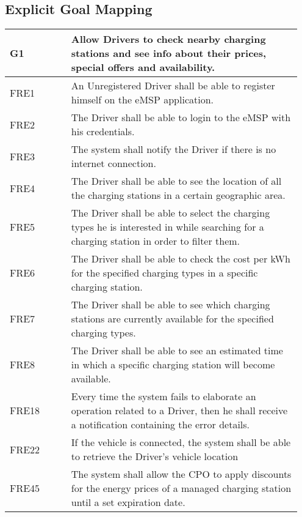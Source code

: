 \subsection{Explicit Goal Mapping}
{\renewcommand{\arraystretch}{1.5}
\begin{longtable}{|p{0.20\linewidth}p{0.75\linewidth}|}
    \hline
    \rowcolor{bluepoli!40}\textbf{G1} & \textbf{Allow Drivers to check nearby charging stations and see info about their prices, special offers and availability.} \\
    \hline
    \rowcolor{bluepoli!15} FRE1 & An Unregistered Driver shall be able to register himself on the eMSP application. \\
    \hline
    \rowcolor{bluepoli!15} FRE2 & The Driver shall be able to login to the eMSP with his credentials. \\
    \hline 
    \rowcolor{bluepoli!15} FRE3 & The system shall notify the Driver if there is no internet connection. \\
    \hline 
    \rowcolor{bluepoli!15} FRE4 & The Driver shall be able to see the location of all the charging stations in a certain geographic area. \\
    \hline 
    \rowcolor{bluepoli!15} FRE5 & The Driver shall be able to select the charging types he is interested in while searching for a charging station in order to filter them. \\
    \hline 
    \rowcolor{bluepoli!15} FRE6 & The Driver shall be able to check the cost per kWh for the specified charging types in a specific charging station. \\
    \hline  
    \rowcolor{bluepoli!15} FRE7 & The Driver shall be able to see which charging stations are currently available for the specified charging types. \\
    \hline  
    \rowcolor{bluepoli!15} FRE8 & The Driver shall be able to see an estimated time in which a specific charging station will become available. \\
    \hline  
    \rowcolor{bluepoli!15} FRE18 & Every time the system fails to elaborate an operation related to a Driver, then he shall receive a notification containing the error details. \\
    \hline  
    \rowcolor{bluepoli!15} FRE22 & If the vehicle is connected, the system shall be able to retrieve the Driver’s vehicle location \\
    \hline  
    \rowcolor{bluepoli!15}
    FRE45 &The system shall allow the CPO to apply discounts for the energy prices of a managed charging station until a set expiration date. \\

\end{longtable}}
